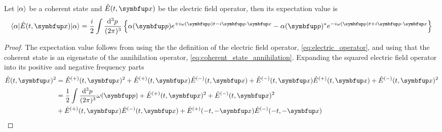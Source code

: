 \begin{theorem}
	Let $\lvert\alpha\rangle$ be a coherent state and $\hat{E}(t,\vb{x})$ be the electric field operator, then its expectation value is
	\begin{equation}
		\bra{\alpha}
		\hat{E}(t,\vb{x})
		\ket{\alpha}
		=
		\frac{i}{2}
		\int\frac{\dd[3]{p}}{(2\pi)^3}
		\left\{
			\alpha(\vb{p})
			e^{+i\omega(\vb{p})t-i\vb{p}\vdot\vb{x}}
			-
			\alpha(\vb{p})^*
			e^{-i\omega(\vb{p})t+i\vb{p}\vdot\vb{x}}
		\right\}
	\end{equation}
\end{theorem}
\begin{proof}
	The expectation value follows from using the the definition of the electric field operator, \cref{eq:electric_operator}, and using that the coherent state is an eigenstate of the annihilation operator, \cref{eq:coherent_state_annihilation}.
	Expanding the squared electric field operator into its positive and negative frequency parts
	\begin{equation}
		\begin{split}
			\hat{E}(t,\vb{x})^2
			&=
			\hat{E}^{(+)}(t,\vb{x})^2
			+
			\hat{E}^{(+)}(t,\vb{x})
			\hat{E}^{(-)}(t,\vb{x})
			+
			\hat{E}^{(-)}(t,\vb{x})
			\hat{E}^{(+)}(t,\vb{x})
			+
			\hat{E}^{(-)}(t,\vb{x})^2
			\\
			&=
			\frac{1}{2}
			\int\frac{\dd[3]{p}}{(2\pi)^3}
			\omega(\vb{p})
			+
			\hat{E}^{(+)}(t,\vb{x})^2
			+
			\hat{E}^{(-)}(t,\vb{x})^2
			\\
			&+
			\hat{E}^{(+)}(t,\vb{x})
			\hat{E}^{(-)}(t,\vb{x})
			+
			\hat{E}^{(+)}(-t,-\vb{x})
			\hat{E}^{(-)}(-t,-\vb{x})
		\end{split}
	\end{equation}
\end{proof}
